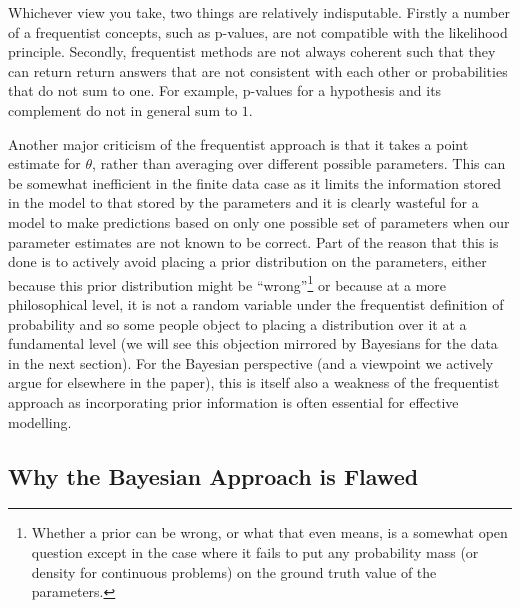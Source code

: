 Whichever view you take, two things are relatively indisputable.  Firstly a number of a frequentist concepts, such as p-values,
are not compatible with the likelihood principle.  Secondly, frequentist methods are not always coherent such that they can
return return answers that are not consistent with each other or probabilities that do not sum to one.  For example, p-values
for a hypothesis and its complement do not in general sum to $1$.  

Another major criticism of the frequentist approach is that it takes a point estimate for $\theta$, rather than averaging
over different possible parameters.  This can be somewhat inefficient in the finite data case as it limits the information
stored in the model to that stored by the parameters and it is clearly wasteful for a model to make predictions based on
only one possible set of parameters when our parameter estimates are not known to be correct.  Part of the reason that this
is done is to actively avoid placing a prior distribution on the parameters, either because this prior distribution might
be ``wrong''\footnote{Whether a prior can be wrong, or what that even means, is a somewhat open question except in the
	case where it fails to put any probability mass (or density for continuous problems) on the ground truth value of
	the parameters.} or because at a more philosophical level, it is not a random variable under the frequentist definition
of probability and so some people object to placing a distribution over it at a fundamental level (we will see this objection
mirrored by Bayesians for the data in the next section).  For the Bayesian perspective (and a viewpoint we actively 
argue for elsewhere in the paper), this is itself also a weakness of the frequentist approach as incorporating prior
information is often essential for effective modelling.


\subsection{Why the Bayesian Approach is Flawed}
\label{sec:bayes:religion:bayes}


